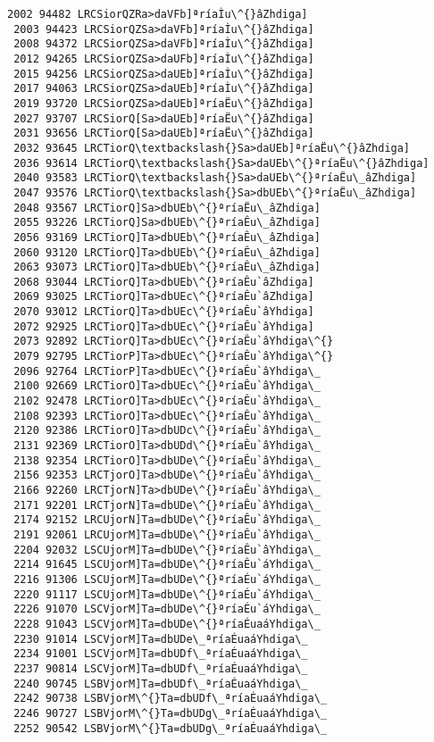 \documentclass[11pt]{article}
\begin{document}
\begin{Verbatim}[commandchars=\\\{\}]
 2002 94482 LRCSiorQZRa>daVFb]ªríaÌu\^{}âZhdiga]
 2003 94423 LRCSiorQZSa>daVFb]ªríaÌu\^{}âZhdiga]
 2008 94372 LRCSiorQZSa>daVFb]ªríaÌu\^{}âZhdiga]
 2012 94265 LRCSiorQZSa>daUFb]ªríaÌu\^{}âZhdiga]
 2015 94256 LRCSiorQZSa>daUEb]ªríaÌu\^{}âZhdiga]
 2017 94063 LRCSiorQZSa>daUEb]ªríaÌu\^{}âZhdiga]
 2019 93720 LRCSiorQZSa>daUEb]ªríaËu\^{}âZhdiga]
 2027 93707 LRCSiorQ[Sa>daUEb]ªríaËu\^{}âZhdiga]
 2031 93656 LRCTiorQ[Sa>daUEb]ªríaËu\^{}âZhdiga]
 2032 93645 LRCTiorQ\textbackslash{}Sa>daUEb]ªríaËu\^{}âZhdiga]
 2036 93614 LRCTiorQ\textbackslash{}Sa>daUEb\^{}ªríaËu\^{}âZhdiga]
 2040 93583 LRCTiorQ\textbackslash{}Sa>daUEb\^{}ªríaËu\_âZhdiga]
 2047 93576 LRCTiorQ\textbackslash{}Sa>dbUEb\^{}ªríaËu\_âZhdiga]
 2048 93567 LRCTiorQ]Sa>dbUEb\^{}ªríaËu\_âZhdiga]
 2055 93226 LRCTiorQ]Sa>dbUEb\^{}ªríaÊu\_âZhdiga]
 2056 93169 LRCTiorQ]Ta>dbUEb\^{}ªríaÊu\_âZhdiga]
 2060 93120 LRCTiorQ]Ta>dbUEb\^{}ªríaÊu\_âZhdiga]
 2063 93073 LRCTiorQ]Ta>dbUEb\^{}ªríaÊu\_âZhdiga]
 2068 93044 LRCTiorQ]Ta>dbUEb\^{}ªríaÊu`âZhdiga]
 2069 93025 LRCTiorQ]Ta>dbUEc\^{}ªríaÊu`âZhdiga]
 2070 93012 LRCTiorQ]Ta>dbUEc\^{}ªríaÊu`âYhdiga]
 2072 92925 LRCTiorQ]Ta>dbUEc\^{}ªríaÊu`âYhdiga]
 2073 92892 LRCTiorQ]Ta>dbUEc\^{}ªríaÊu`âYhdiga\^{}
 2079 92795 LRCTiorP]Ta>dbUEc\^{}ªríaÊu`âYhdiga\^{}
 2096 92764 LRCTiorP]Ta>dbUEc\^{}ªríaÊu`âYhdiga\_
 2100 92669 LRCTiorO]Ta>dbUEc\^{}ªríaÊu`âYhdiga\_
 2102 92478 LRCTiorO]Ta>dbUEc\^{}ªríaÊu`âYhdiga\_
 2108 92393 LRCTiorO]Ta>dbUEc\^{}ªríaÊu`âYhdiga\_
 2120 92386 LRCTiorO]Ta>dbUDc\^{}ªríaÊu`âYhdiga\_
 2131 92369 LRCTiorO]Ta>dbUDd\^{}ªríaÊu`âYhdiga\_
 2138 92354 LRCTiorO]Ta>dbUDe\^{}ªríaÊu`âYhdiga\_
 2156 92353 LRCTjorO]Ta>dbUDe\^{}ªríaÊu`âYhdiga\_
 2166 92260 LRCTjorN]Ta>dbUDe\^{}ªríaÊu`âYhdiga\_
 2171 92201 LRCTjorN]Ta=dbUDe\^{}ªríaÊu`âYhdiga\_
 2174 92152 LRCUjorN]Ta=dbUDe\^{}ªríaÊu`âYhdiga\_
 2191 92061 LRCUjorM]Ta=dbUDe\^{}ªríaÊu`âYhdiga\_
 2204 92032 LSCUjorM]Ta=dbUDe\^{}ªríaÊu`âYhdiga\_
 2214 91645 LSCUjorM]Ta=dbUDe\^{}ªríaÊu`áYhdiga\_
 2216 91306 LSCUjorM]Ta=dbUDe\^{}ªríaÉu`áYhdiga\_
 2220 91117 LSCUjorM]Ta=dbUDe\^{}ªríaÉu`áYhdiga\_
 2226 91070 LSCVjorM]Ta=dbUDe\^{}ªríaÉu`áYhdiga\_
 2228 91043 LSCVjorM]Ta=dbUDe\^{}ªríaÉuaáYhdiga\_
 2230 91014 LSCVjorM]Ta=dbUDe\_ªríaÉuaáYhdiga\_
 2234 91001 LSCVjorM]Ta=dbUDf\_ªríaÉuaáYhdiga\_
 2237 90814 LSCVjorM]Ta=dbUDf\_ªríaÉuaáYhdiga\_
 2240 90745 LSBVjorM]Ta=dbUDf\_ªríaÉuaáYhdiga\_
 2242 90738 LSBVjorM\^{}Ta=dbUDf\_ªríaÉuaáYhdiga\_
 2246 90727 LSBVjorM\^{}Ta=dbUDg\_ªríaÉuaáYhdiga\_
 2252 90542 LSBVjorM\^{}Ta=dbUDg\_ªríaÉuaáYhdiga\_

\end{Verbatim}
\end{document}
